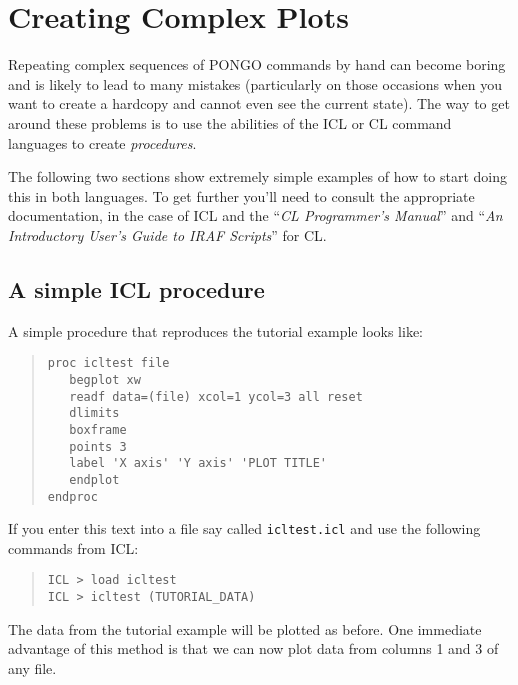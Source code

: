 \section{Creating Complex Plots}

Repeating complex sequences of PONGO commands by hand can become
boring and is likely to lead to many mistakes (particularly on those
occasions when you want to create a hardcopy and cannot even see the
current state). The way to get around these problems is to use the
abilities of the ICL or CL command languages to create {\em
procedures}.

The following two sections show extremely simple examples of how to
start doing this in both languages. To get further you'll need to
consult the appropriate documentation,  in the case
of ICL and the ``{\em CL Programmer's Manual}'' and
``{\em An Introductory User's Guide to IRAF Scripts}'' for CL.

\subsection{A simple ICL procedure}

A simple procedure that reproduces the tutorial example looks like:
\begin{quote}
\begin{verbatim}
proc icltest file
   begplot xw
   readf data=(file) xcol=1 ycol=3 all reset
   dlimits
   boxframe
   points 3
   label 'X axis' 'Y axis' 'PLOT TITLE'
   endplot
endproc
\end{verbatim}
\end{quote}
If you enter this text into a file say called \verb+icltest.icl+ and use
the following commands from ICL:
\begin{quote}
\begin{verbatim}
ICL > load icltest
ICL > icltest (TUTORIAL_DATA)
\end{verbatim}
\end{quote}
The data from the tutorial example will be plotted as before. One
immediate advantage of this method is that we can now plot data from
columns 1 and 3 of any file.

